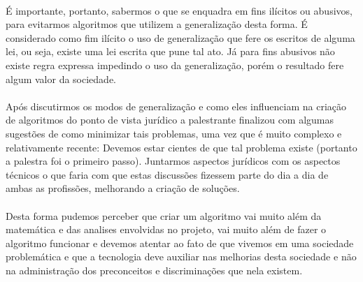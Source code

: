 \documentclass[12pt]{article}
\begin{document}
	\paragraph{}	
		É importante, portanto, sabermos o que se enquadra em fins
		ilícitos ou abusivos, para evitarmos algoritmos que utilizem a
		generalização desta forma. É considerado como fim ilícito o uso
		de generalização que fere os escritos de alguma lei, ou seja, existe 
		uma lei escrita que pune tal ato. Já para fins abusivos não existe regra
		expressa impedindo o uso da generalização, porém o resultado fere 
		algum valor da sociedade.		
	\paragraph{}	
		Após discutirmos os modos de generalização e como eles influenciam
		na criação de algoritmos do ponto de vista jurídico a palestrante
		finalizou com algumas sugestões de como minimizar tais problemas,
		uma vez que é muito complexo e relativamente recente:\newline
		Devemos estar cientes de que tal problema existe (portanto a palestra
		foi o primeiro passo).\newline
		Juntarmos aspectos jurídicos com os aspectos técnicos  o que faria com que
		estas discussões fizessem parte do dia a dia de ambas as profissões,
		melhorando a criação de soluções.
	\paragraph{}
		Desta forma pudemos perceber que criar um algoritmo vai muito além
		da matemática e das analises envolvidas no projeto, vai muito além de
		fazer o algoritmo funcionar e devemos atentar ao fato de que vivemos
		em uma sociedade problemática e que a tecnologia deve auxiliar nas
		melhorias desta sociedade e não na administração dos preconceitos e
		discriminações que nela existem.	
\end{document}
